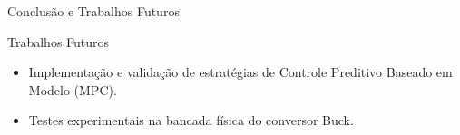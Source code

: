 \documentclass[aspectratio=169]{beamer}
\begin{document}
\begin{frame}{Conclusão e Trabalhos Futuros}

  
\begin{block}{Trabalhos Futuros}
    \begin{itemize}
        \item Implementação e validação de estratégias de Controle Preditivo Baseado em Modelo (MPC).
        \item Testes experimentais na bancada física do conversor Buck.
    \end{itemize}
\end{block}

\end{frame}
 
  \begin{frame}
      \titlepage
  \end{frame}

    
\end{document}
